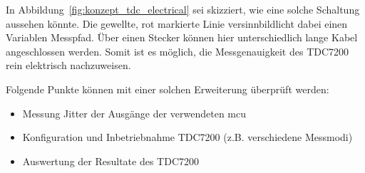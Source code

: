 In Abbildung~\ref{fig:konzept_tdc_electrical} sei skizziert, wie eine solche Schaltung aussehen könnte. Die gewellte,
rot markierte Linie versinnbildlicht dabei einen Variablen Messpfad. Über einen Stecker können hier unterschiedlich lange
Kabel angeschlossen werden. Somit ist es möglich, die Messgenauigkeit des TDC7200 rein elektrisch nachzuweisen.

Folgende Punkte können mit einer solchen Erweiterung überprüft werden:

\begin{itemize}
    \item Messung Jitter der Ausgänge der verwendeten \acrshort{mcu}
    \item Konfiguration und Inbetriebnahme TDC7200 (z.B. verschiedene Messmodi)
    \item Auswertung der Resultate des TDC7200
\end{itemize}
